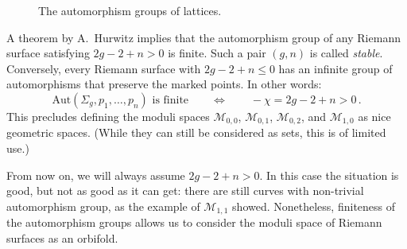 \documentclass[11pt,reqno]{amsart}
\numberwithin{equation}{section}
\newcommand{\iu}{\mathrm{i}}
\newcommand{\Aut}{\mathrm{Aut}}
\newcommand{\mc}[1]{\mathcal{#1}}
\newcommand{\M}{\mc{M}}
\theoremstyle{plain}
\theoremstyle{definition}
\begin{document}
\begin{figure}
  \caption{The automorphism groups of lattices.}
  \label{fig:aut:lattices}
\end{figure}

A theorem by A.~Hurwitz implies that the automorphism group of any Riemann surface satisfying $2g - 2 + n > 0$ is finite. Such a pair $(g,n)$ is called \emph{stable}. Conversely, every Riemann surface with $2g - 2 + n \le 0$ has an infinite group of automorphisms that preserve the marked points. In other words:
\begin{equation}
  \Aut(\Sigma_g,p_1,\dots,p_n) \text{ is finite}
  \qquad\Longleftrightarrow\qquad
  -\chi = 2g - 2 + n > 0 \,.
\end{equation}
This precludes defining the moduli spaces $\M_{0,0}$, $\M_{0,1}$, $\M_{0,2}$, and $\M_{1,0}$ as nice geometric spaces. (While they can still be considered as sets, this is of limited use.)

From now on, we will always assume $2g - 2 + n > 0$. In this case the situation is good, but not as good as it can get: there are still curves with non-trivial automorphism group, as the example of $\M_{1,1}$ showed. Nonetheless, finiteness of the automorphism groups allows us to consider the moduli space of Riemann surfaces as an orbifold.
\end{document}
